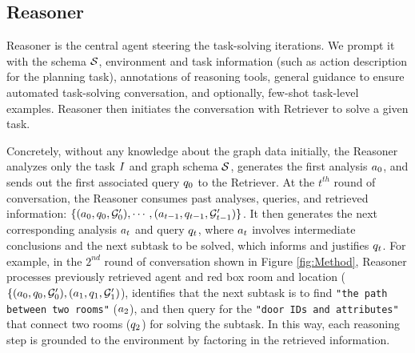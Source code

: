 


\subsection{Reasoner}

Reasoner is the central agent steering the task-solving iterations. We prompt it with the schema ${\mathcal{S}}$, environment and task information (such as action description for the planning task), annotations of reasoning tools, general guidance to ensure automated task-solving conversation, and optionally, few-shot task-level examples. Reasoner then initiates the conversation with Retriever to solve a given task.

Concretely, without any knowledge about the graph data initially, the Reasoner analyzes only the task ${I}$ and graph schema ${\mathcal{S}}$, generates the first analysis $a_0$, and sends out the first associated query $q_0$ to the Retriever. At the $t^{th}$ round of conversation, the Reasoner consumes past analyses, queries, and retrieved information: $\{(a_0, q_0, {\mathcal{G}}^\prime_0), \cdots, (a_{t-1}, q_{t-1}, {\mathcal{G}}^\prime_{t-1})\}$.
It then generates the next corresponding analysis $a_t$ and query $q_{t}$, where $a_t$ involves intermediate conclusions and the next subtask to be solved, which informs and justifies $q_{t}$.
For example, in the $2^{nd}$ round of conversation shown in Figure  \ref{fig:Method}, Reasoner processes previously retrieved agent and red box room and location ($\{(a_0, q_0, {\mathcal{G}}^\prime_0), (a_{1}, q_{1}, {\mathcal{G}}^\prime_{1})$),
identifies that the next subtask is to find \texttt{\small "the path between two rooms"} ($a_2$), and then query for the \texttt{\small "door IDs and attributes"} that connect two rooms ($q_2$) for solving the subtask. In this way, each reasoning step is grounded to the environment by factoring in the retrieved information. %

